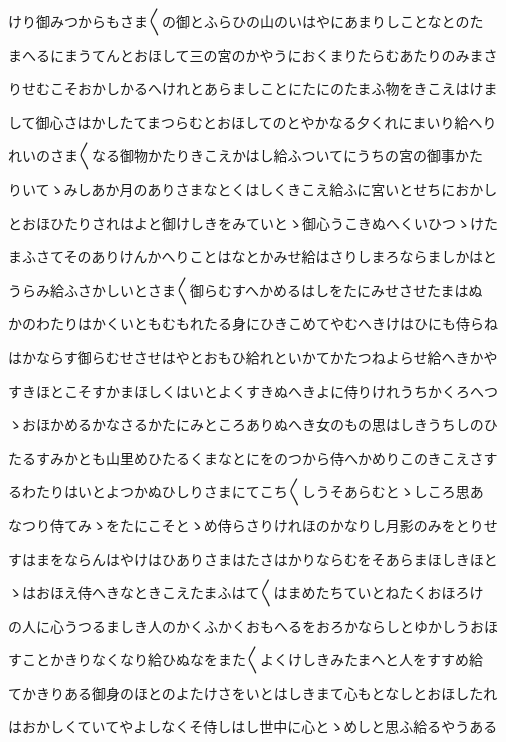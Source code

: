 \documentclass[a4paper,11pt,landscape]{ltjtarticle}
\begin{document}
けり御みつからもさま〱の御とふらひの山のいはやにあまりしことなとのた
\par\medskip
まへるにまうてんとおほして三の宮のかやうにおくまりたらむあたりのみまさ
\par\medskip
りせむこそおかしかるへけれとあらましことにたにのたまふ物をきこえはけま
\par\medskip
して御心さはかしたてまつらむとおほしてのとやかなる夕くれにまいり給へり
\par\medskip
れいのさま〱なる御物かたりきこえかはし給ふついてにうちの宮の御事かた
\par\medskip
りいてゝみしあか月のありさまなとくはしくきこえ給ふに宮いとせちにおかし
\par\medskip
とおほひたりされはよと御けしきをみていとゝ御心うこきぬへくいひつゝけた
\par\medskip
まふさてそのありけんかへりことはなとかみせ給はさりしまろならましかはと
\par\medskip
うらみ給ふさかしいとさま〱御らむすへかめるはしをたにみせさせたまはぬ
\par\medskip
かのわたりはかくいともむもれたる身にひきこめてやむへきけはひにも侍らね
\par\medskip
はかならす御らむせさせはやとおもひ給れといかてかたつねよらせ給へきかや
\par\medskip
すきほとこそすかまほしくはいとよくすきぬへきよに侍りけれうちかくろへつ
\par\medskip
ゝおほかめるかなさるかたにみところありぬへき女のもの思はしきうちしのひ
\par\medskip
たるすみかとも山里めひたるくまなとにをのつから侍へかめりこのきこえさす
\par\medskip
るわたりはいとよつかぬひしりさまにてこち〱しうそあらむとゝしころ思あ
\par\medskip
なつり侍てみゝをたにこそとゝめ侍らさりけれほのかなりし月影のみをとりせ
\par\medskip
すはまをならんはやけはひありさまはたさはかりならむをそあらまほしきほと
\par\medskip
ゝはおほえ侍へきなときこえたまふはて〱はまめたちていとねたくおほろけ
\par\medskip
の人に心うつるましき人のかくふかくおもへるをおろかならしとゆかしうおほ
\par\medskip
すことかきりなくなり給ひぬなをまた〱よくけしきみたまへと人をすすめ給
\par\medskip
てかきりある御身のほとのよたけさをいとはしきまて心もとなしとおほしたれ
\par\medskip
はおかしくていてやよしなくそ侍しはし世中に心とゝめしと思ふ給るやうある
\end{document}
